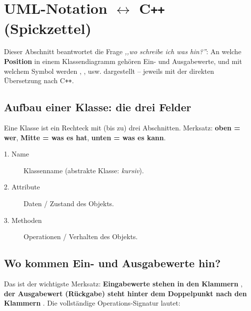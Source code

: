 \section{UML-Notation $\leftrightarrow$ C\texttt{++} (Spickzettel)}
Dieser Abschnitt beantwortet die Frage \emph{,,wo schreibe ich was hin?''}: An welche \textbf{Position} in einem Klassendiagramm geh\"oren Ein- und Ausgabewerte, und mit welchem Symbol werden , ,  usw. dargestellt -- jeweils mit der direkten \"Ubersetzung nach C\texttt{++}.

\subsection{Aufbau einer Klasse: die drei Felder}
Eine Klasse ist ein Rechteck mit (bis zu) drei Abschnitten. Merksatz: \textbf{oben = wer}, \textbf{Mitte = was es hat}, \textbf{unten = was es kann}.
\begin{description}
  \item[1. Name] Klassenname (abstrakte Klasse: \emph{kursiv}).
  \item[2. Attribute] Daten / Zustand des Objekts.
  \item[3. Methoden] Operationen / Verhalten des Objekts.
\end{description}

\subsection{Wo kommen Ein- und Ausgabewerte hin?}
Das ist der wichtigste Merksatz: \textbf{Eingabewerte stehen in den Klammern} \code{( \dots )}, \textbf{der Ausgabewert (R\"uckgabe) steht hinter dem Doppelpunkt nach den Klammern} . Die vollst\"andige Operations-Signatur lautet:
\begin{syntaxbox}
 \\
\end{syntaxbox}

